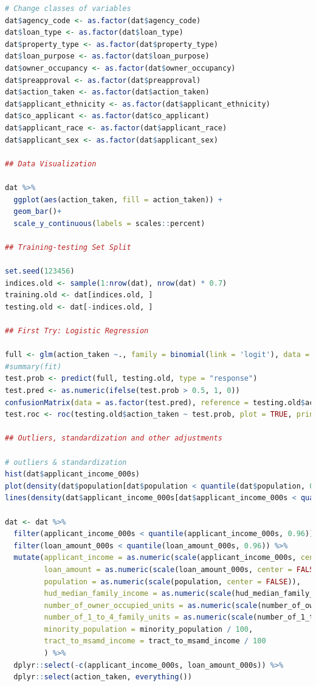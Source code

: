 \documentclass{jpp}
\begin{document}
\begin{lstlisting}[language=R]
# Change classes of variables
dat$agency_code <- as.factor(dat$agency_code)
dat$loan_type <- as.factor(dat$loan_type)
dat$property_type <- as.factor(dat$property_type)
dat$loan_purpose <- as.factor(dat$loan_purpose)
dat$owner_occupancy <- as.factor(dat$owner_occupancy)
dat$preapproval <- as.factor(dat$preapproval)
dat$action_taken <- as.factor(dat$action_taken)
dat$applicant_ethnicity <- as.factor(dat$applicant_ethnicity)
dat$co_applicant <- as.factor(dat$co_applicant)
dat$applicant_race <- as.factor(dat$applicant_race)
dat$applicant_sex <- as.factor(dat$applicant_sex)

## Data Visualization

dat %>%
  ggplot(aes(action_taken, fill = action_taken)) + 
  geom_bar()+
  scale_y_continuous(labels = scales::percent)

## Training-testing Set Split

set.seed(123456)
indices.old <- sample(1:nrow(dat), nrow(dat) * 0.7)
training.old <- dat[indices.old, ]
testing.old <- dat[-indices.old, ]

## First Try: Logistic Regression

full <- glm(action_taken ~., family = binomial(link = 'logit'), data = training.old)
#summary(fit)
test.prob <- predict(full, testing.old, type = "response")
test.pred <- as.numeric(ifelse(test.prob > 0.5, 1, 0))
confusionMatrix(data = as.factor(test.pred), reference = testing.old$action_taken, positive = "1")
test.roc <- roc(testing.old$action_taken ~ test.prob, plot = TRUE, print.auc = TRUE)

## Outliers, standardization and other adjustments

# outliers & standardization
hist(dat$applicant_income_000s)
plot(density(dat$population[dat$population < quantile(dat$population, 0.99)]))
lines(density(dat$applicant_income_000s[dat$applicant_income_000s < quantile(dat$applicant_income_000s, 0.99)]))

dat <- dat %>%
  filter(applicant_income_000s < quantile(applicant_income_000s, 0.96)) %>%
  filter(loan_amount_000s < quantile(loan_amount_000s, 0.96)) %>%
  mutate(applicant_income = as.numeric(scale(applicant_income_000s, center = FALSE)), 
         loan_amount = as.numeric(scale(loan_amount_000s, center = FALSE)), 
         population = as.numeric(scale(population, center = FALSE)), 
         hud_median_family_income = as.numeric(scale(hud_median_family_income, center = FALSE)),
         number_of_owner_occupied_units = as.numeric(scale(number_of_owner_occupied_units, center = FALSE)),
         number_of_1_to_4_family_units = as.numeric(scale(number_of_1_to_4_family_units, center = FALSE)),
         minority_population = minority_population / 100,
         tract_to_msamd_income = tract_to_msamd_income / 100
         ) %>%
  dplyr::select(-c(applicant_income_000s, loan_amount_000s)) %>%
  dplyr::select(action_taken, everything())


\end{lstlisting}
\end{document}
